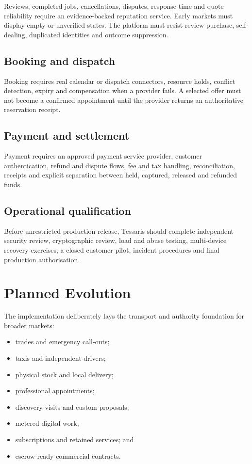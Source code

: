 \documentclass[11pt,a4paper]{article}
\begin{document}
Reviews, completed jobs, cancellations, disputes, response time and quote
reliability require an evidence-backed reputation service.  Early markets must
display empty or unverified states.  The platform must resist review purchase,
self-dealing, duplicated identities and outcome suppression.

\subsection{Booking and dispatch}

Booking requires real calendar or dispatch connectors, resource holds,
conflict detection, expiry and compensation when a provider fails.  A selected
offer must not become a confirmed appointment until the provider returns an
authoritative reservation receipt.

\subsection{Payment and settlement}

Payment requires an approved payment service provider, customer authentication,
refund and dispute flows, fee and tax handling, reconciliation, receipts and
explicit separation between held, captured, released and refunded funds.

\subsection{Operational qualification}

Before unrestricted production release, Tessaris should complete independent
security review, cryptographic review, load and abuse testing, multi-device
recovery exercises, a closed customer pilot, incident procedures and final
production authorisation.

\section{Planned Evolution}

The implementation deliberately lays the transport and authority foundation
for broader markets:

\begin{itemize}
  \item trades and emergency call-outs;
  \item taxis and independent drivers;
  \item physical stock and local delivery;
  \item professional appointments;
  \item discovery visits and custom proposals;
  \item metered digital work;
  \item subscriptions and retained services; and
  \item escrow-ready commercial contracts.
\end{itemize}
\end{document}
